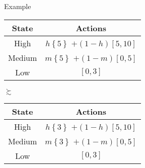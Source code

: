 \documentclass[usenames,dvipsnames,aspectratio=169,11pt, envcountsect]{beamer}
\begin{document}
\begin{frame}{Example}
	\begin{table}[H]
		\centering
		\begin{minipage}{0.45\textwidth}
			\centering
			\begin{tabular}{c | c}
				State                          & Actions                                                                                       \\
				\hline
				{\color{bleudefrance} High}    & {\color{bleudefrance}\( h \left\{ 5 \right\} \) } \(+ \left(1-h \right) \left[5,10 \right] \) \\
				{\color{bleudefrance} Medium } & {\color{bleudefrance}\( m \left\{ 5 \right\} \) } \(+ \left(1-m \right) \left[0,5 \right] \)  \\
				Low                            & \( \left[0,3 \right] \)                                                                       \\
			\end{tabular}
			\vspace{0.5cm} %
		\end{minipage}\hspace{0.25cm} \pause %
		\( \succsim \) %
		\hspace{0.25cm}
		\begin{minipage}{0.45\textwidth}
			\centering
			\begin{tabular}{c | c}
				State                          & Actions                                                                                       \\
				\hline
				{\color{bleudefrance} High}    & {\color{bleudefrance}\( h \left\{ 3 \right\} \) } \(+ \left(1-h \right) \left[5,10 \right] \) \\
				{\color{bleudefrance} Medium } & {\color{bleudefrance}\( m \left\{ 3 \right\} \) } \(+ \left(1-m \right) \left[0,5 \right] \)  \\
				Low                            & \( \left[0,3 \right] \)                                                                       \\
			\end{tabular}
			\vspace{0.5cm} %
		\end{minipage}
	\end{table} \pause


\end{frame}
\end{document}

